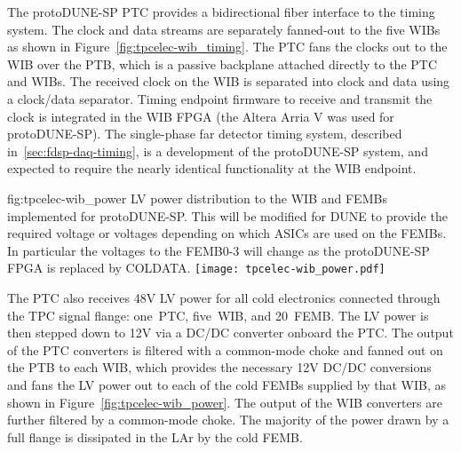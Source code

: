 The protoDUNE-SP PTC provides a bidirectional fiber interface to the
timing system. The clock and data
streams are separately fanned-out to the five WIBs as shown in
Figure~\ref{fig:tpcelec-wib_timing}. The PTC fans the clocks out to the WIB over the
PTB, which is a passive backplane attached directly to the PTC and
WIBs.  The received clock on the WIB is separated into clock and
data using a clock/data separator. Timing endpoint firmware to receive and transmit
the clock is integrated in the WIB FPGA (the Altera Arria V was used for protoDUNE-SP).
The single-phase far detector timing system, described in~\ref{sec:fdsp-daq-timing}, is a development of the protoDUNE-SP system, and expected to require the nearly identical functionality at the WIB endpoint.

\begin{dunefigure}
{fig:tpcelec-wib_power}
{LV power distribution to the WIB and FEMBs implemented for protoDUNE-SP. This will be modified for DUNE to provide the required voltage or voltages depending on which ASICs are used on the FEMBs. In particular the voltages to the FEMB0-3 will change as the protoDUNE-SP FPGA is replaced by COLDATA. }
\texttt{[image: tpcelec-wib\_power.pdf]}
\end{dunefigure}

The PTC also receives 48V LV power for all cold
electronics connected through the TPC signal flange: one~PTC, five~WIB, and 20~FEMB. The LV power is then stepped down
to 12V via a DC/DC converter onboard the PTC. The output of the PTC converters is filtered with a common-mode choke and fanned out
on the PTB to each WIB, which provides the necessary 12V DC/DC conversions and fans
the LV power out to each of the cold FEMBs supplied by that WIB, 
as shown in Figure~\ref{fig:tpcelec-wib_power}. The output of the WIB converters are further filtered by a common-mode choke. The 
majority of the power drawn by a full flange is dissipated in the LAr by the cold FEMB.


